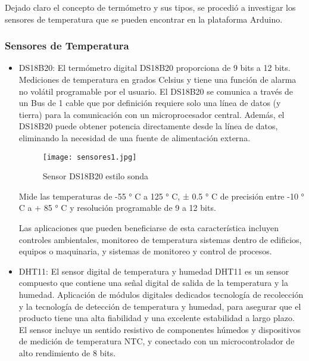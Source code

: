 \par \noindent
Dejado claro el concepto de termómetro y sus tipos, se procedió a investigar los sensores de temperatura que se pueden encontrar en la plataforma Arduino.

\subsubsection{Sensores de Temperatura}	

\begin{itemize}
	\item DS18B20: El termómetro digital DS18B20 proporciona de 9 bits a 12 bits.
	Mediciones de temperatura en grados Celsius y tiene una función de alarma no volátil programable por el usuario. El DS18B20 se comunica a través de un Bus de 1 cable que por definición requiere solo una línea de datos (y tierra) para la comunicación con un microprocesador central. Además, el DS18B20 puede obtener potencia directamente desde la línea de datos, eliminando la necesidad de una fuente de alimentación externa\cite{ds18b20}.
	
	\begin{figure}[H]
		\centering
		\texttt{[image: sensores1.jpg]}
		\caption{Sensor DS18B20 estilo sonda}
	\end{figure}
	
	\par \noindent
	Mide las temperaturas de -55 ° C a 125 ° C, ± 0.5 ° C de precisión entre -10 ° C a + 85 ° C y resolución programable de 9 a 12 bits.
	
	\par \noindent
	Las aplicaciones que pueden beneficiarse de esta característica incluyen
	controles ambientales, monitoreo de temperatura
	sistemas dentro de edificios, equipos o maquinaria, y
	sistemas de monitoreo y control de procesos\cite{ds18b20}. 
	
	\item DHT11: El sensor digital de temperatura y humedad DHT11 es un sensor compuesto que contiene una
	señal digital de salida de la temperatura y la humedad. Aplicación de módulos digitales dedicados
	tecnología de recolección y la tecnología de detección de temperatura y humedad, para asegurar que
	el producto tiene una alta fiabilidad y una excelente estabilidad a largo plazo. El sensor incluye un sentido resistivo
	de componentes húmedos y dispositivos de medición de temperatura NTC, y conectado con un
	microcontrolador de alto rendimiento de 8 bits\cite{dht11}.
	

\end{itemize}
